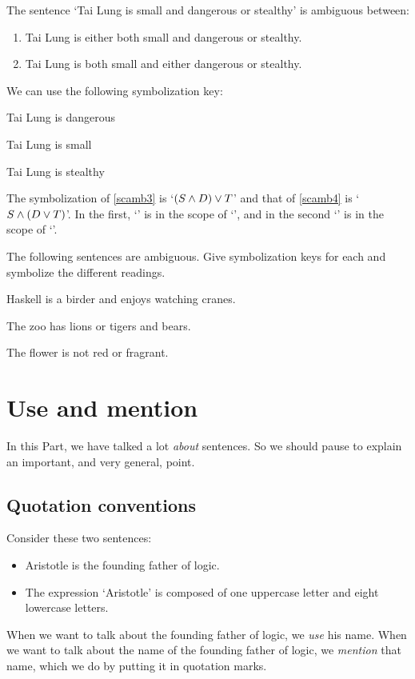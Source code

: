 The sentence `Tai Lung is small and dangerous or stealthy' is ambiguous between:
\begin{enumerate}
	\item\label{scamb3} Tai Lung is either both small and dangerous or stealthy.
	\item\label{scamb4} Tai Lung is both small and either dangerous or stealthy.
\end{enumerate}
We can use the following symbolization key:
\begin{ekey}
	\item[D] Tai Lung is dangerous
	\item[S] Tai Lung is small
	\item[T] Tai Lung is stealthy
\end{ekey}
The symbolization of \cref*{scamb3} is `$(S \wedge D) \vee T$' and that of \cref*{scamb4} is `$S \wedge (D \vee T)$'. In the first, `\eand' is in the scope of `\eor', and in the second `\eor' is in the scope of `\eand'.

\practiceproblems
\solutions
\problempart The following sentences are ambiguous. Give symbolization keys for each and symbolize the different readings.
\begin{compactlist}
	\item Haskell is a birder and enjoys watching cranes.
	\item The zoo has lions or tigers and bears.
	\item The flower is not red or fragrant.
\end{compactlist}

\chapter{Use and mention}\label{s:UseMention}
In this Part, we have talked a lot \emph{about} sentences. So we should pause to explain an important, and very general, point.

\section{Quotation conventions}
Consider these two sentences:
	\begin{itemize}
		\item Aristotle is the founding father of logic.
		\item The expression `Aristotle' is composed of one uppercase letter and eight lowercase letters.
	\end{itemize}
When we want to talk about the founding father of logic, we \emph{use}
his name. When we want to talk about the name of the founding father
of logic, we \emph{mention} that name, which we do by putting it in
quotation marks.

